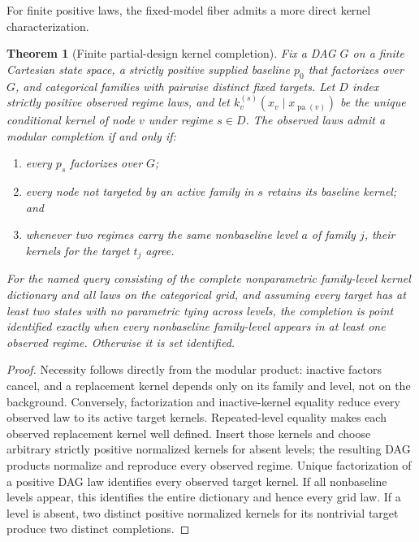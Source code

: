 \documentclass[11pt]{article}
\newtheorem{theorem}{Theorem}[section]
\newcommand{\pa}{\operatorname{pa}}
\begin{document}
For finite positive laws, the fixed-model fiber admits a more direct kernel
characterization.

\begin{theorem}[Finite partial-design kernel completion]
\label{thm:partial-kernel-completion}
Fix a DAG \(G\) on a finite Cartesian state space, a strictly positive supplied
baseline \(p_0\) that factorizes over \(G\), and categorical families with
pairwise distinct fixed targets.  Let \(D\) index strictly positive observed
regime laws, and let
\(k_v^{(s)}(x_v\mid x_{\pa(v)})\) be the unique conditional kernel of node \(v\)
under regime \(s\in D\).  The observed laws admit a modular completion if and
only if:
\begin{enumerate}
\item every \(p_s\) factorizes over \(G\);
\item every node not targeted by an active family in \(s\) retains its baseline
kernel; and
\item whenever two regimes carry the same nonbaseline level \(a\) of family
\(j\), their kernels for the target \(t_j\) agree.
\end{enumerate}
For the named query consisting of the complete nonparametric family-level
kernel dictionary and all laws on the categorical grid, and assuming every
target has at least two states with no parametric tying across levels, the
completion is point identified exactly when every nonbaseline family-level
appears in at least one observed regime.  Otherwise it is set identified.
\end{theorem}

\begin{proof}
Necessity follows directly from the modular product: inactive factors cancel,
and a replacement kernel depends only on its family and level, not on the
background.  Conversely, factorization and inactive-kernel equality reduce
every observed law to its active target kernels.  Repeated-level equality makes
each observed replacement kernel well defined.  Insert those kernels and choose
arbitrary strictly positive normalized kernels for absent levels; the resulting
DAG products normalize and reproduce every observed regime.  Unique
factorization of a positive DAG law identifies every observed target kernel.  If
all nonbaseline levels appear, this identifies the entire dictionary and hence
every grid law.  If a level is absent, two distinct positive normalized kernels
for its nontrivial target produce two distinct completions.
\end{proof}
\end{document}
